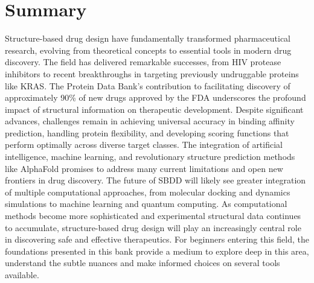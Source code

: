\section{Summary}
Structure-based drug design have fundamentally transformed pharmaceutical research, evolving from theoretical concepts to essential tools in modern drug discovery. The field has delivered remarkable successes, from HIV protease inhibitors to recent breakthroughs in targeting previously undruggable proteins like KRAS. The Protein Data Bank’s contribution to facilitating discovery of approximately 90\% of new drugs approved by the FDA underscores the profound impact of structural information on therapeutic development. Despite significant advances, challenges remain in achieving universal accuracy in binding affinity prediction, handling protein flexibility, and developing scoring functions that perform optimally across diverse target classes. The integration of artificial intelligence, machine learning, and revolutionary structure prediction methods like AlphaFold promises to address many current limitations and open new frontiers in drug discovery. The future of SBDD will likely see greater integration of multiple computational approaches, from molecular docking and dynamics simulations to machine learning and quantum computing. As computational methods become more sophisticated and experimental structural data continues to accumulate, structure-based drug design will play an increasingly central role in discovering safe and effective therapeutics. For beginners entering this field, the foundations presented in this bank provide a medium to explore deep in this area, understand the subtle nuances and make informed choices on several tools available. 

